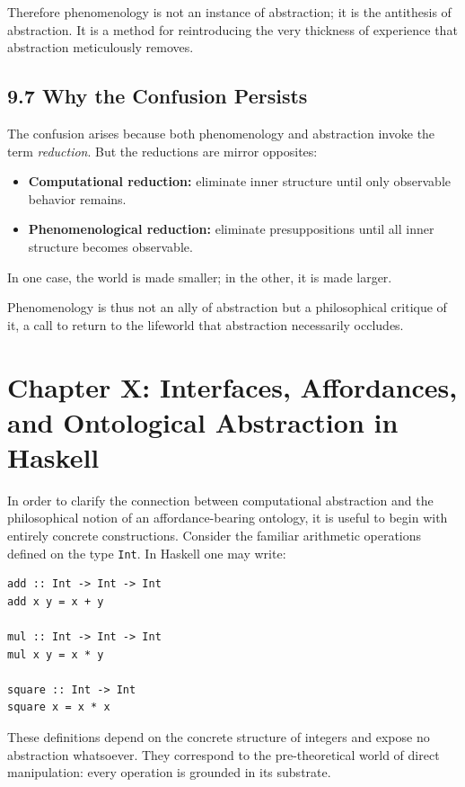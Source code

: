 \documentclass[11pt,letterpaper]{article}
\begin{document}
Therefore phenomenology is not an instance of abstraction; it is the antithesis of abstraction. It is a method for reintroducing the very thickness of experience that abstraction meticulously removes.

\subsection{9.7 Why the Confusion Persists}
The confusion arises because both phenomenology and abstraction invoke the term \emph{reduction}. But the reductions are mirror opposites:

\begin{itemize}
    \item \textbf{Computational reduction:} eliminate inner structure until only observable behavior remains.
    \item \textbf{Phenomenological reduction:} eliminate presuppositions until all inner structure becomes observable.
\end{itemize}

In one case, the world is made smaller; in the other, it is made larger.

Phenomenology is thus not an ally of abstraction but a philosophical critique of it, a call to return to the lifeworld that abstraction necessarily occludes.

\newpage

\section{Chapter X: Interfaces, Affordances, and Ontological Abstraction in Haskell}

In order to clarify the connection between computational abstraction and the philosophical notion of an affordance-bearing ontology, it is useful to begin with entirely concrete constructions. Consider the familiar arithmetic operations defined on the type \texttt{Int}. In Haskell one may write:
\begin{verbatim}
add :: Int -> Int -> Int
add x y = x + y

mul :: Int -> Int -> Int
mul x y = x * y

square :: Int -> Int
square x = x * x
\end{verbatim}

These definitions depend on the concrete structure of integers and expose no abstraction whatsoever. They correspond to the pre-theoretical world of direct manipulation: every operation is grounded in its substrate.
\end{document}
